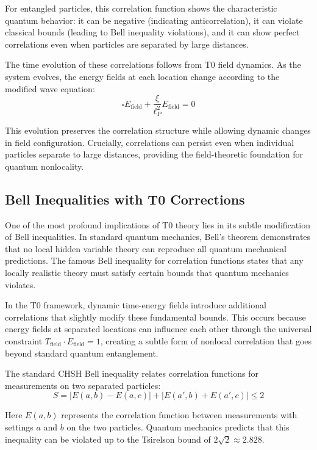 \documentclass[12pt,a4paper]{article}
\newcommand{\xipar}{\xi}
\theoremstyle{definition}
\theoremstyle{remark}
\begin{document}
	For entangled particles, this correlation function shows the characteristic quantum behavior: it can be negative (indicating anticorrelation), it can violate classical bounds (leading to Bell inequality violations), and it can show perfect correlations even when particles are separated by large distances.
	
	The time evolution of these correlations follows from T0 field dynamics. As the system evolves, the energy fields at each location change according to the modified wave equation:
	$$\square E_{\text{field}} + \frac{\xipar}{\ell_P^2} E_{\text{field}} = 0$$
	
	This evolution preserves the correlation structure while allowing dynamic changes in field configuration. Crucially, correlations can persist even when individual particles separate to large distances, providing the field-theoretic foundation for quantum nonlocality.
	
	\subsection{Bell Inequalities with T0 Corrections}
	
	One of the most profound implications of T0 theory lies in its subtle modification of Bell inequalities. In standard quantum mechanics, Bell's theorem demonstrates that no local hidden variable theory can reproduce all quantum mechanical predictions. The famous Bell inequality for correlation functions states that any locally realistic theory must satisfy certain bounds that quantum mechanics violates.
	
	In the T0 framework, dynamic time-energy fields introduce additional correlations that slightly modify these fundamental bounds. This occurs because energy fields at separated locations can influence each other through the universal constraint $T_{\text{field}} \cdot E_{\text{field}} = 1$, creating a subtle form of nonlocal correlation that goes beyond standard quantum entanglement.
	
	The standard CHSH Bell inequality relates correlation functions for measurements on two separated particles:
	\begin{equation}
		S = |E(a,b) - E(a,c)| + |E(a',b) + E(a',c)| \leq 2
		\label{eq:standard_bell}
	\end{equation}
	
	Here $E(a,b)$ represents the correlation function between measurements with settings $a$ and $b$ on the two particles. Quantum mechanics predicts that this inequality can be violated up to the Tsirelson bound of $2\sqrt{2} \approx 2.828$.
	
\end{document}

